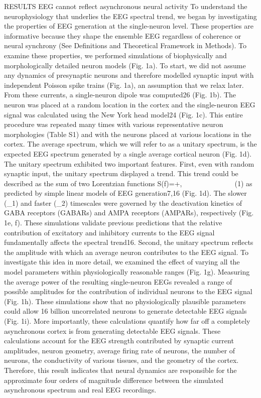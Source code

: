 RESULTS
EEG cannot reflect asynchronous neural activity
To understand the neurophysiology that underlies the EEG spectral trend, we began by investigating the properties of EEG generation at the single-neuron level. These properties are informative because they shape the ensemble EEG regardless of coherence or neural synchrony (See Definitions and Theoretical Framework in Methods). To examine these properties, we performed simulations of biophysically and morphologically detailed neuron models (Fig. 1a). To start, we did not assume any dynamics of presynaptic neurons and therefore modelled synaptic input with independent Poisson spike trains (Fig. 1a), an assumption that we relax later. From these currents, a single-neuron dipole was computed26 (Fig. 1b). The neuron was placed at a random location in the cortex and the single-neuron EEG signal was calculated using the New York head model24 (Fig. 1c). This entire procedure was repeated many times with various representative neuron morphologies (Table S1) and with the neurons placed at various locations in the cortex. The average spectrum, which we will refer to as a unitary spectrum, is the expected EEG spectrum generated by a single average cortical neuron (Fig. 1d). 
	The unitary spectrum exhibited two important features. First, even with random synaptic input, the unitary spectrum displayed a trend. This trend could be described as the sum of two Lorentzian functions
S\left(f\right)=+,\ \ \ \ \ \ \ \ \ \ \ \ \ \ \ (1)
as predicted by simple linear models of EEG generation7,16 (Fig. 1d). The slower (\tau_1) and faster (\tau_2) timescales were governed by the deactivation kinetics of GABA receptors (GABARs) and AMPA receptors (AMPARs), respectively (Fig. 1e, f). These simulations validate previous predictions that the relative contribution of excitatory and inhibitory currents to the EEG signal fundamentally affects the spectral trend16.
Second, the unitary spectrum reflects the amplitude with which an average neuron contributes to the EEG signal. To investigate this idea in more detail, we examined the effect of varying all the model parameters within physiologically reasonable ranges (Fig. 1g). Measuring the average power of the resulting single-neuron EEGs revealed a range of possible amplitudes for the contribution of individual neurons to the EEG signal (Fig. 1h). These simulations show that no physiologically plausible parameters could allow 16 billion uncorrelated neurons to generate detectable EEG signals (Fig. 1i). More importantly, these calculations quantify how far off a completely asynchronous cortex is from generating detectable EEG signals. These calculations account for the EEG strength contributed by synaptic current amplitudes, neuron geometry, average firing rate of neurons, the number of neurons, the conductivity of various tissues, and the geometry of the cortex. Therefore, this result indicates that neural dynamics are responsible for the approximate four orders of magnitude difference between the simulated asynchronous spectrum and real EEG recordings.

